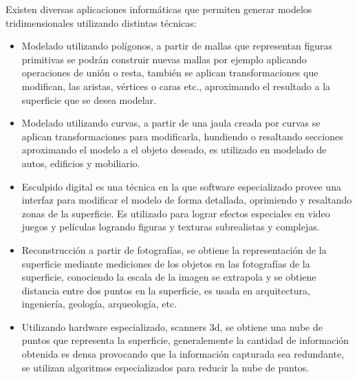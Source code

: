 Existen diversas aplicaciones informáticas que permiten generar modelos tridimensionales utilizando distintas técnicas:
\begin{itemize}
  \item Modelado utilizando polígonos, a partir de mallas que representan figuras primitivas se podrán construir nuevas mallas por ejemplo aplicando operaciones de unión o resta, también se aplican transformaciones que modifican, las aristas, vértices o caras etc., aproximando el resultado a la superficie que se desea modelar.
  \item  Modelado utilizando curvas, a partir de una jaula creada por curvas se aplican transformaciones para modificarla, hundiendo o resaltando secciones aproximando el modelo a el objeto deseado, es utilizado en modelado de autos, edificios y mobiliario.
  \item Esculpido digital es una técnica en la que software especializado provee una interfaz para modificar el modelo de forma detallada, oprimiendo y resaltando zonas de la superficie. Es utilizado para lograr efectos especiales en video juegos y películas logrando figuras y texturas subrealistas y complejas.
  \item Reconstrucción a partir de fotografías, se obtiene la representación de la superficie mediante mediciones de los objetos en las fotografías de la superficie, conociendo la escala de la imagen se extrapola y se obtiene distancia entre dos puntos en la superficie, es usada en arquitectura, ingeniería, geología, arqueología, etc.
  \item Utilizando hardware especializado, scanners 3d, se obtiene una nube de puntos que representa la superficie, generalemente la cantidad de información obtenida es densa provocando que la información capturada sea redundante, se utilizan algoritmos especializados para reducir la nube de puntos.
\end{itemize}
